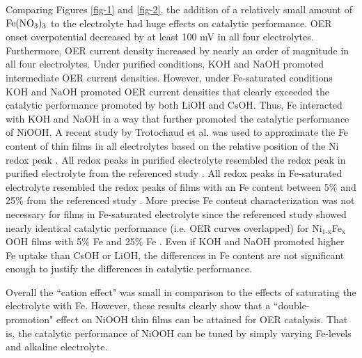 \documentclass[journal=jpccck,manuscript=article,email=true]{achemso}
\begin{document}
Comparing Figures \ref{fig-1} and \ref{fig-2}, the addition of a relatively small amount of \(\ce{Fe(NO3)3}\) to the electrolyte had huge effects on catalytic performance. OER onset overpotential decreased by at least 100 mV in all four electrolytes. Furthermore, OER current density increased by nearly an order of magnitude in all four electrolytes. Under purified conditions, KOH and NaOH promoted intermediate OER current densities. However, under Fe-saturated conditions KOH and NaOH promoted OER current densities that clearly exceeded the catalytic performance promoted by both LiOH and CsOH. Thus, Fe interacted with KOH and NaOH in a way that further promoted the catalytic performance of NiOOH. A recent study by Trotochaud et al. was used to approximate the Fe content of thin films in all electrolytes based on the relative position of the Ni redox peak \cite{trotochaud-2014-nickel-iron}. All redox peaks in purified electrolyte resembled the redox peak in purified electrolyte from the referenced study \cite{trotochaud-2014-nickel-iron}. All redox peaks in Fe-saturated electrolyte resembled the redox peaks of films with an Fe content between 5\% and 25\% from the referenced study \cite{trotochaud-2014-nickel-iron}. More precise Fe content characterization was not necessary for films in Fe-saturated electrolyte since the referenced study showed nearly identical catalytic performance (i.e. OER curves overlapped) for Ni$_{\text{1-x}}$Fe$_{\text{x}}$OOH films with 5\% Fe and 25\% Fe \cite{trotochaud-2014-nickel-iron}. Even if KOH and NaOH promoted higher Fe uptake than CsOH or LiOH, the differences in Fe content are not significant enough to justify the differences in catalytic performance.

Overall the ``cation effect" was small in comparison to the effects of saturating the electrolyte with Fe. However, these results clearly show that a ``double-promotion" effect on NiOOH thin films can be attained for OER catalysis. That is, the catalytic performance of NiOOH can be tuned by simply varying Fe-levels and alkaline electrolyte.
\end{document}
